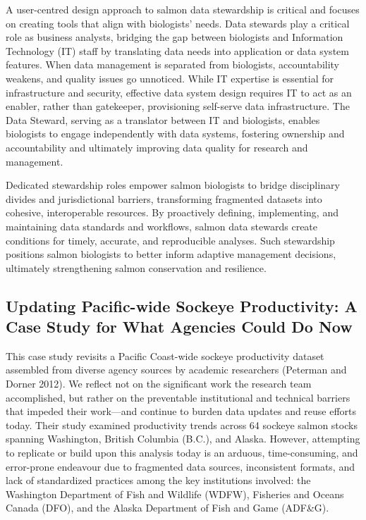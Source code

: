 \documentclass[
  letterpaper,
  DIV=11,
  numbers=noendperiod]{scrartcl}
\begin{document}
A user-centred design approach to salmon data stewardship is critical
and focuses on creating tools that align with biologists' needs. Data
stewards play a critical role as business analysts, bridging the gap
between biologists and Information Technology (IT) staff by translating
data needs into application or data system features. When data
management is separated from biologists, accountability weakens, and
quality issues go unnoticed. While IT expertise is essential for
infrastructure and security, effective data system design requires IT to
act as an enabler, rather than gatekeeper, provisioning self-serve data
infrastructure. The Data Steward, serving as a translator between IT and
biologists, enables biologists to engage independently with data
systems, fostering ownership and accountability and ultimately improving
data quality for research and management.

Dedicated stewardship roles empower salmon biologists to bridge
disciplinary divides and jurisdictional barriers, transforming
fragmented datasets into cohesive, interoperable resources. By
proactively defining, implementing, and maintaining data standards and
workflows, salmon data stewards create conditions for timely, accurate,
and reproducible analyses. Such stewardship positions salmon biologists
to better inform adaptive management decisions, ultimately strengthening
salmon conservation and resilience.

\subsection{Updating Pacific-wide Sockeye Productivity: A Case Study for
What Agencies Could Do
Now}\label{updating-pacific-wide-sockeye-productivity-a-case-study-for-what-agencies-could-do-now}

This case study revisits a Pacific Coast-wide sockeye productivity
dataset assembled from diverse agency sources by academic researchers
(Peterman and Dorner 2012). We reflect not on the significant work the
research team accomplished, but rather on the preventable institutional
and technical barriers that impeded their work---and continue to burden
data updates and reuse efforts today. Their study examined productivity
trends across 64 sockeye salmon stocks spanning Washington, British
Columbia (B.C.), and Alaska. However, attempting to replicate or build
upon this analysis today is an arduous, time-consuming, and error-prone
endeavour due to fragmented data sources, inconsistent formats, and lack
of standardized practices among the key institutions involved: the
Washington Department of Fish and Wildlife (WDFW), Fisheries and Oceans
Canada (DFO), and the Alaska Department of Fish and Game (ADF\&G).
\end{document}
